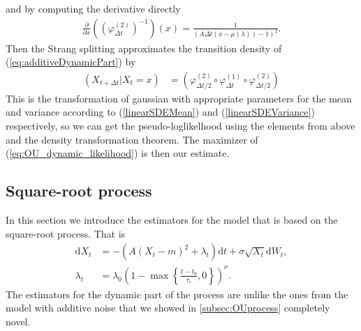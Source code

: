 and by computing the derivative directly
\begin{align}
    \frac{\partial}{\partial x} \left(\left(\varphi^{(2)}_{\Delta t}\right)^{-1}\right)(x) = \frac{1}{\left(A \Delta t\left(x-\mu\left(\lambda \right)\right) - 1\right)^2}.
\end{align}
Then the Strang splitting approximates the transition density of (\ref{eq:additiveDynamicPart}) by
\begin{align}
    \left(X_{t + \Delta t} | X_t = x\right) &= \left(\varphi^{(2)}_{\Delta t / 2}\circ \varphi^{(1)}_{\Delta t} \circ \varphi^{(2)}_{\Delta t / 2}\right) \label{eq:OU_dynamic_likelihood}
\end{align}
This is the transformation of gaussian with appropriate parameters for the mean and variance according to (\ref{linearSDEMean}) and (\ref{linearSDEVariance}) respectively, so we can get the pseudo-loglikelhood using the elements from above and the density transformation theorem. The maximizer of (\ref{eq:OU_dynamic_likelihood}) is then our estimate. \newpage
\subsection{Square-root process}\label{subsec:squareroot}
In this section we introduce the estimators for the model that is based on the square-root process. That is
\begin{align}
    \mathrm{d}X_t &= -\left(A\left(X_t - m\right)^2 + \lambda_t\right)\mathrm{d}t + \sigma \sqrt{X_t} \mathrm{d}W_t \label{eq:additiveModelAppedix},\\
    \lambda_t &= \lambda_0\left(1 - \max\left\{\frac{t - t_0}{\tau_c}, 0\right\}\right)^\nu.
\end{align}
The estimators for the dynamic part of the process are unlike the ones from the model with additive noise that we showed in \ref{subsec:OUprocess} completely novel.
